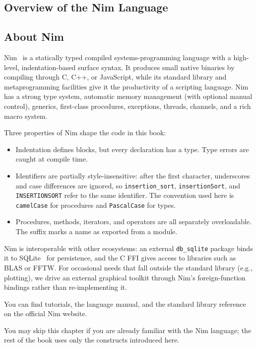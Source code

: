 \documentclass[justified, sixbynine]{tufte-book}
\def\ft{\small\tt}
\theoremstyle{plain}%
\newtheorem * {corollary}{Corollary}
\theoremstyle{definition}
\theoremstyle{remark}
\newtheorem * {remark}{Remark}
\newtheorem * {note}{Note}
\begin{document}
\begin{fullwidth}
\goodbreak\chapter{Overview of the Nim Language}


\goodbreak\section{About Nim}

Nim~\cite{nim} is a statically typed compiled systems-programming language with a high-level, indentation-based surface syntax. It produces small native binaries by compiling through C, C++, or JavaScript, while its standard library and metaprogramming facilities give it the productivity of a scripting language. Nim has a strong type system, automatic memory management (with optional manual control), generics, first-class procedures, exceptions, threads, channels, and a rich macro system.

Three properties of Nim shape the code in this book:
\begin{itemize}
\item Indentation defines blocks, but every declaration has a type. Type errors are caught at compile time.
\item Identifiers are partially style-insensitive: after the first character, underscores and case differences are ignored, so {\ft insertion\_sort}, {\ft insertionSort}, and {\ft INSERTIONSORT} refer to the same identifier. The convention used here is {\ft camelCase} for procedures and {\ft PascalCase} for types.
\item Procedures, methods, iterators, and operators are all separately overloadable. The {\ft *} suffix marks a name as exported from a module.
\end{itemize}

Nim is interoperable with other ecosystems: an external {\ft db\_sqlite} package binds it to SQLite~\cite{sqlite} for persistence, and the C FFI gives access to libraries such as BLAS or FFTW. For occasional needs that fall outside the standard library (e.g., plotting), we drive an external graphical toolkit through Nim's foreign-function bindings rather than re-implementing it.

You can find tutorials, the language manual, and the standard library reference on the official Nim website.

You may skip this chapter if you are already familiar with the Nim language; the rest of the book uses only the constructs introduced here.


\end{fullwidth}
\end{document}
